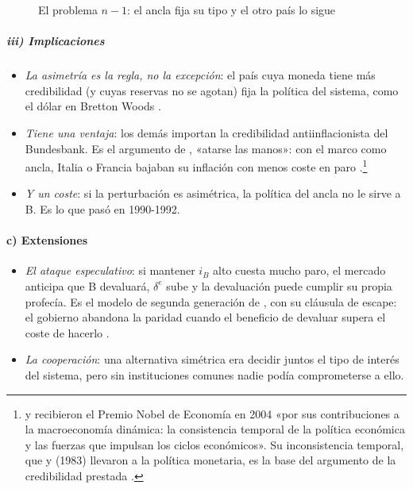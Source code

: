 \documentclass[11pt]{article}
\begin{document}
\begin{figure}[H]
\centering
\caption{El problema $n-1$: el ancla fija su tipo y el otro país lo sigue}\label{fig:asimetria}
\end{figure}

\subparagraph{iii) Implicaciones}

\begin{itemize}
\item \emph{La asimetría es la regla, no la excepción}: el país cuya moneda tiene más credibilidad (y cuyas reservas no se agotan) fija la política del sistema, como el dólar en Bretton Woods .
\item \emph{Tiene una ventaja}: los demás importan la credibilidad antiinflacionista del Bundesbank. Es el argumento de \textcite{GiavazziPagano1988Advantage}, «atarse las manos»: con el marco como ancla, Italia o Francia bajaban su inflación con menos coste en paro .\footnote{ y  recibieron el Premio Nobel de Economía en 2004 «por sus contribuciones a la macroeconomía dinámica: la consistencia temporal de la política económica y las fuerzas que impulsan los ciclos económicos»\nocite{Nobel2004KydlandPrescott}. Su inconsistencia temporal, que  y  (1983) llevaron a la política monetaria, es la base del argumento de la credibilidad prestada\nocite{KydlandPrescott1977Rules,BarroGordon1983Positive} .}
\item \emph{Y un coste}: si la perturbación es asimétrica, la política del ancla no le sirve a B. Es lo que pasó en 1990-1992.
\end{itemize}

\paragraph{c) Extensiones}

\begin{itemize}
\item \emph{El ataque especulativo}: si mantener $i_B$ alto cuesta mucho paro, el mercado anticipa que B devaluará, $\delta^e$ sube y la devaluación puede cumplir su propia profecía. Es el modelo de segunda generación de \textcite{Obstfeld1996}, con su cláusula de escape: el gobierno abandona la paridad cuando el beneficio de devaluar supera el coste de hacerlo .
\item \emph{La cooperación}: una alternativa simétrica era decidir juntos el tipo de interés del sistema, pero sin instituciones comunes nadie podía comprometerse a ello.
\end{itemize}
\end{document}
